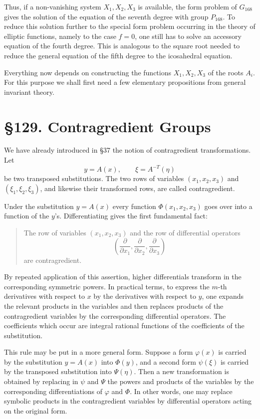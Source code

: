 \documentclass[11pt,a4paper]{book}
\newcommand{\webersection}[2]{\clearpage\section*{\S #1. #2}}
\begin{document}
Thus, if a non-vanishing system \(X_1,X_2,X_3\) is available, the form problem of \(G_{168}\) gives the solution of the equation of the seventh degree with group \(P_{168}\).  To reduce this solution further to the special form problem occurring in the theory of elliptic functions, namely to the case \(f=0\), one still has to solve an accessory equation of the fourth degree.  This is analogous to the square root needed to reduce the general equation of the fifth degree to the icosahedral equation.

Everything now depends on constructing the functions \(X_1,X_2,X_3\) of the roots \(A_i\).  For this purpose we shall first need a few elementary propositions from general invariant theory.

\webersection{129}{Contragredient Groups}

We have already introduced in \S 37 the notion of contragredient transformations.  Let
\[
 y=A(x),
\qquad \xi=A^{-T}(\eta)
\]
be two transposed substitutions.  The two rows of variables \((x_1,x_2,x_3)\) and \((\xi_1,\xi_2,\xi_3)\), and likewise their transformed rows, are called contragredient.

Under the substitution \(y=A(x)\) every function \(\Phi(x_1,x_2,x_3)\) goes over into a function of the \(y\)'s.  Differentiating gives the first fundamental fact:
\begin{quote}
The row of variables \((x_1,x_2,x_3)\) and the row of differential operators
\[
 \left(\frac{\partial}{\partial x_1},\frac{\partial}{\partial x_2},\frac{\partial}{\partial x_3}\right)
\]
are contragredient.
\end{quote}

By repeated application of this assertion, higher differentials transform in the corresponding symmetric powers.  In practical terms, to express the \(m\)-th derivatives with respect to \(x\) by the derivatives with respect to \(y\), one expands the relevant products in the variables and then replaces products of the contragredient variables by the corresponding differential operators.  The coefficients which occur are integral rational functions of the coefficients of the substitution.

This rule may be put in a more general form.  Suppose a form \(\varphi(x)\) is carried by the substitution \(y=A(x)\) into \(\Phi(y)\), and a second form \(\psi(\xi)\) is carried by the transposed substitution into \(\Psi(\eta)\).  Then a new transformation is obtained by replacing in \(\psi\) and \(\Psi\) the powers and products of the variables by the corresponding differentiations of \(\varphi\) and \(\Phi\).  In other words, one may replace symbolic products in the contragredient variables by differential operators acting on the original form.
\end{document}
